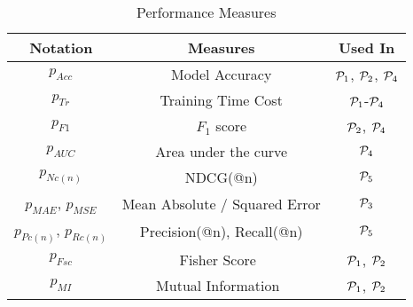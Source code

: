


\begin{table}
    \centering
 \begin{center}
 \begin{small}
     \begin{tabular}{|c|c|c|} \hline
       Notation &  Measures    & Used In  \\ \hline
       $p_{Acc}$   & Model Accuracy &   $\P_1$, $\P_2$, $\P_4$ \\ \hline
       $p_{Tr}$   & Training Time Cost  &   $\P_1$-$\P_4$ \\ \hline
       $p_{F1}$   & $F_1$ score  &   $\P_2$, $\P_4$ \\ \hline
       $p_{AUC}$   & Area under the curve  &   $\P_4$ \\ \hline
       $p_{Nc(n)}$   & NDCG(@n)  &   $\P_5$ \\ \hline
       $p_{MAE}$, $p_{MSE}$   & Mean Absolute / Squared Error &   $\P_3$\\ \hline
       $p_{Pc(n)}$, $p_{Rc(n)}$   & Precision(@n), Recall(@n) &   $\P_5$\\ 
       \hline \hline
       $p_{Fsc}$   & Fisher Score~\cite{li2017feature} &   $\P_1$, $\P_2$ \\ \hline
       $p_{MI}$   & Mutual Information~\cite{li2017feature,galhotra2023metam} &   $\P_1$, $\P_2$ \\ \hline
     \end{tabular}
     \end{small}
    \caption{Performance Measures}
     \label{tab-measures}
     \end{center}
\vspace{-5ex}
\end{table}






